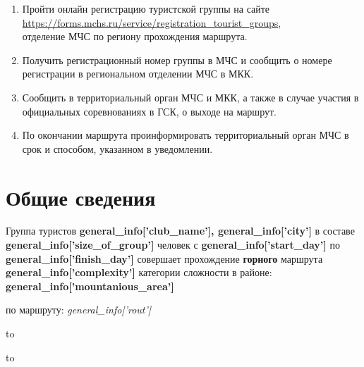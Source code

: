 \documentclass[a5paper, 12pt, twoside]{article}
\begin{document}
    \begin{enumerate}[leftmargin=0.5cm, rightmargin=0cm]
        \item Пройти онлайн регистрацию туристской группы на сайте\hfil\\
        {\small\url{https://forms.mchs.ru/service/registration_tourist_groups}},\\
        отделение МЧС по региону прохождения маршрута.
        \item Получить регистрационный номер группы в МЧС и сообщить о
        номере регистрации в региональном отделении МЧС в МКК.
        \item Сообщить в территориальный орган МЧС и МКК, а также в случае
        участия в официальных соревнованиях в ГСК, о выходе на маршрут.
        \item По окончании маршрута проинформировать территориальный орган
        МЧС в срок и способом, указанном в уведомлении.
    \end{enumerate}

    \setlength\parindent{0pt}

\newpage %

    \section{Общие сведения}\label{s:group}
        Группа туристов \textbf{%
        {{general_info['club_name']}}, {{general_info['city']}}}
        в составе \textbf{%
        {{general_info['size_of_group']}}}
        человек
        с \textbf{%
        {{general_info['start_day']}}}
        по \textbf{%
        {{general_info['finish_day']}}} совершает
        прохождение \textbf{горного} маршрута \textbf{%
        {{general_info['complexity']}}} категории сложности
        в районе: \textbf{%
        {{general_info['mountanious_area']}}}
        \vspace{0.5cm}
        
        по маршруту: \textit{%
            {{general_info['rout']}}
        }
        \vspace{2.5cm}
        
        \hbox to 

        \hbox to 
        \vspace{1.5cm}
        
\end{document}

